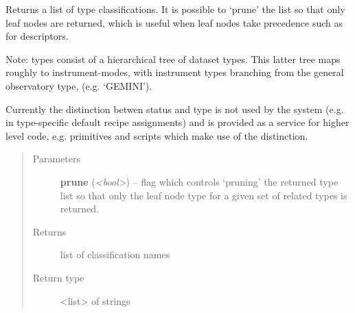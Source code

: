 \documentclass[letterpaper,10pt,english]{sphinxmanual}
\begin{document}
\begin{fulllineitems}
\begin{fulllineitems}
\end{fulllineitems}


\begin{fulllineitems}
\label{astro_class:astrodata.AstroData.type}
Returns a list of type classifications. It is possible to `prune' 
the list so that only leaf nodes are returned, which is 
useful when leaf nodes take precedence such as for descriptors.

Note: types consist of a hierarchical tree of dataset types.
This latter tree maps roughly to instrument-modes, with instrument 
types branching from the general observatory type, (e.g. `GEMINI').

Currently the distinction betwen status and type is not used by the
system (e.g. in type-specific default recipe assignments) and is
provided as a service for higher level code, e.g. primitives and
scripts which make use of the distinction.
\begin{quote}\begin{description}
\item[{Parameters}] \leavevmode
\textbf{prune} (\emph{\textless{}bool\textgreater{}}) -- flag which controls `pruning' the returned type list 
so that only the leaf node type for a given set of 
related types is returned.

\item[{Returns}] \leavevmode
list of classification names

\item[{Return type}] \leavevmode
\textless{}list\textgreater{} of strings

\end{description}\end{quote}

\end{fulllineitems}



\end{fulllineitems}
\end{document}
